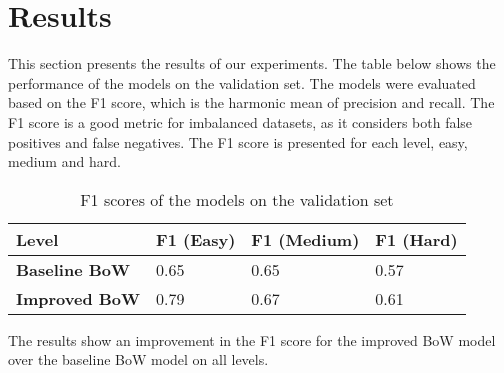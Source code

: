 \section{Results}

This section presents the results of our experiments. The table below shows the performance of the models on the validation set. The models were evaluated based on the F1 score, which is the harmonic mean of precision and recall. The F1 score is a good metric for imbalanced datasets, as it considers both false positives and false negatives. The F1 score is presented for each level, easy, medium and hard.

\begin{table}[ht]
\centering
\begin{tabular}{|l|l|l|l|}
    \hline
    \textbf{Level} & \textbf{F1 (Easy)} & \textbf{F1 (Medium)} & \textbf{F1 (Hard)} \\ \hline
    \textbf{Baseline BoW} & 0.65 & 0.65 & 0.57 \\ \hline
    \textbf{Improved BoW} & 0.79 & 0.67 & 0.61 \\ \hline
\end{tabular}
\caption{F1 scores of the models on the validation set}
\end{table}

The results show an improvement in the F1 score for the improved BoW model over the baseline BoW model on all levels. 